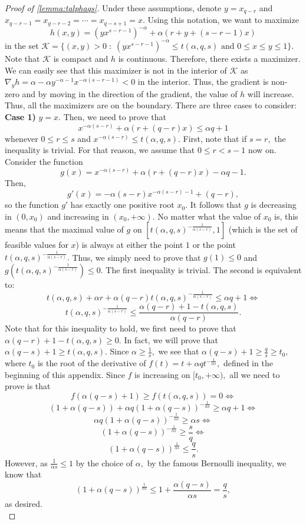 \documentclass[11pt]{article}\usepackage{amsfonts}
\numberwithin{theorem}{subsection}
\begin{document}
\begin{proof}[Proof of \cref{lemma:talphaqs}]
\noindent
Under these assumptions, denote $y = x_{q-r}$ and
$x_{q-r-1} = x_{g-r-2} = \cdots = x_{q-s+1}   = x.$ Using this notation, we want to maximize 
$$
h(x,y) = (yx^{s-r-1})^{-\alpha} + \alpha(r + y + (s-r-1)x)
$$
in the set $\mathcal{K}=\{(x,y)>0 \; :\;(yx^{s-r-1})^{-\alpha} \le t(\alpha, q, s)\text{ and }0\le x\le y \le 1\}.$ Note that $\mathcal{K}$ is compact and $h$ is continuous. Therefore, there exists a maximizer. We can easily see that this maximizer is not in the interior of $\mathcal{K}$ as $\nabla_y h =  \alpha - \alpha y^{-\alpha - 1}x^{-\alpha (s-r-1)} <0$ in the interior. Thus, the gradient is non-zero and by moving in the direction of the gradient, the value of $h$ will increase. Thus, all the maximizers are on the boundary. There are three cases to consider:\\
\textbf{Case 1)} $y = x.$ Then, we need to prove that 
$$
x^{-\alpha (s-r)} + \alpha (r + (q-r)x)\le \alpha q + 1
$$
whenever $0\le r \le s$ and $x^{-\alpha (s-r)}\le t(\alpha, q, s).$ First, note that if $s = r,$ the inequality is trivial. For that reason, we assume that $0\le r <s-1$ now on. Consider the function $$g(x) = x^{-\alpha (s-r)} + \alpha (r + (q-r)x) - \alpha q - 1.$$ Then, 
$$
g'(x) = 
-\alpha(s-r)x^{-\alpha(s-r)-1} + (q-r),
$$
so the function $g'$ has  exactly one positive root $x_0.$ It follows that $g$ is decreasing in $(0,x_0)$ and increasing in $(x_0,+\infty).$ No matter what the value of $x_0$ is, this means that the maximal value of $g$ on $[t(\alpha, q, s)^{-\frac{1}{\alpha(s-r)}},1]$ (which is the set of feasible values for $x$) is always at either the point $1$ or the point $t(\alpha, q, s)^{-\frac{1}{\alpha(s-r)}}.$ Thus, we simply need to prove that $g(1)\le 0$ and 
$g(t(\alpha, q, s)^{-\frac{1}{\alpha(s-r)}})\le 0.$ The first inequality is trivial. The second is equivalent to:
$$
t(\alpha, q, s) + 
\alpha r  + \alpha(q-r)t(\alpha, q, s)^{-\frac{1}{\alpha(s-r)}}\le \alpha q + 1 \Longleftrightarrow
$$
$$
t(\alpha,q,s)^{-\frac{1}{\alpha(s-r)}}
\le \frac{\alpha (q-r)+1 - t(\alpha,q,s)}{\alpha (q-r)}.
$$
Note that for this inequality to hold, we first need to prove that $\alpha (q-r)+1 - t(\alpha,q,s)\ge 0.$ In fact, we will prove that 
$
\alpha (q-s)+1 \ge  t(\alpha,q,s).$ Since $\alpha \ge \frac{1}{s},$ we see that $\alpha (q-s)+1 \ge \frac{q}{s}\ge t_0,$ where $t_0$ is the root of the derivative of $f(t) = t + \alpha qt^{-\frac{1}{\alpha s}},$ defined in the beginning of this appendix. Since $f$ is increasing on $[t_0,+\infty),$ all we need to prove is that 
$$
f(\alpha (q-s)+1)\ge 
f(t({\alpha,q,s})) = 0 \Longleftrightarrow
$$
$$
(1 + \alpha(q-s)) + \alpha q (1+\alpha (q-s))^{-\frac{1}{\alpha s}}\ge \alpha q + 1 \Longleftrightarrow
$$
$$
\alpha q (1+\alpha (q-s))^{-\frac{1}{\alpha s}} \ge \alpha s \Longleftrightarrow
$$
$$
(1+\alpha (q-s))^{-\frac{1}{\alpha s}} \ge \frac{s}{q} \Longleftrightarrow
$$
$$
(1+\alpha (q-s))^{\frac{1}{\alpha s}} \le \frac{q}{s}.
$$
However, as $\frac{1}{\alpha s}\le 1$ by the choice of $\alpha, $ by the famous Bernoulli inequality, we know that 
$$
(1+\alpha (q-s))^{\frac{1}{\alpha s}}\le 
1 + \frac{\alpha (q-s)}{\alpha s} = \frac{q}{s},
$$
as desired.\\



\end{proof}
\end{document}

